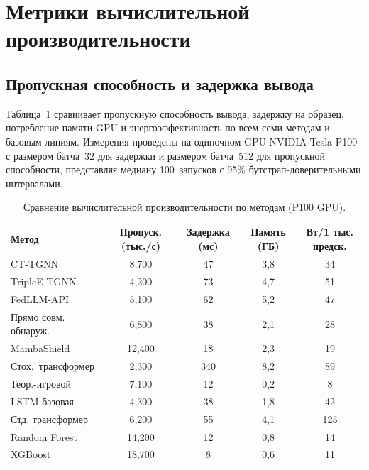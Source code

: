 \section{Метрики вычислительной производительности}
\label{app:comp_perf}

\subsection{Пропускная способность и задержка вывода}
\label{app:throughput}

Таблица~\ref{tab:app_throughput} сравнивает пропускную способность вывода, задержку на образец, потребление памяти GPU и энергоэффективность по всем семи методам и базовым линиям. Измерения проведены на одиночном GPU NVIDIA Tesla P100 с размером батча~32 для задержки и размером батча~512 для пропускной способности, представляя медиану 100~запусков с 95\% бутстрап-доверительными интервалами.

\begin{table}[htbp]
\centering
\caption{Сравнение вычислительной производительности по методам (P100 GPU).}
\label{tab:app_throughput}
\begin{tabular}{lcccc}
\toprule
Метод & Пропуск. (тыс./с) & Задержка (мс) & Память (ГБ) & Вт/1 тыс. предск. \\
\midrule
CT-TGNN            & 8{,}700 & 47 & 3,8 & 34 \\
TripleE-TGNN       & 4{,}200 & 73 & 4,7 & 51 \\
FedLLM-API         & 5{,}100 & 62 & 5,2 & 47 \\
Прямо совм. обнаруж. & 6{,}800 & 38 & 2,1 & 28 \\
MambaShield        & 12{,}400 & 18 & 2,3 & 19 \\
Стох.\ трансформер  & 2{,}300 & 340 & 8,2 & 89 \\
Теор.-игровой      & 7{,}100 & 12 & 0,2 & 8 \\
\midrule
LSTM базовая       & 4{,}300 & 38 & 1,8 & 42 \\
Стд. трансформер   & 6{,}200 & 55 & 4,1 & 125 \\
Random Forest      & 14{,}200 & 12 & 0,8 & 14 \\
XGBoost            & 18{,}700 & 8 & 0,6 & 11 \\
\bottomrule
\end{tabular}
\end{table}


